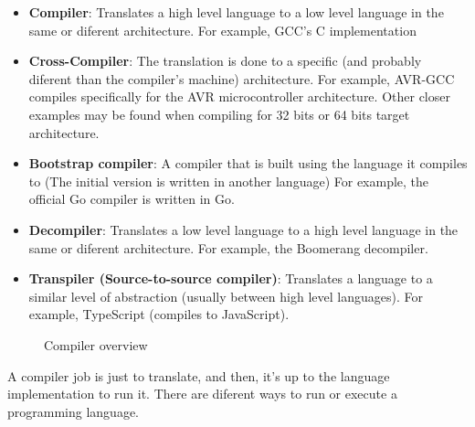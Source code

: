 \begin{itemize}
    \item \textbf{Compiler}: Translates a high level language to a low level language in the same or diferent architecture.
        For example, GCC's C implementation
    \item \textbf{Cross-Compiler}: The translation is done to a specific (and probably diferent than the compiler's machine) architecture.
        For example, AVR-GCC compiles specifically for the AVR microcontroller architecture. Other closer examples may be found when compiling for
        32 bits or 64 bits target architecture.
    \item \textbf{Bootstrap compiler}: A compiler that is built using the language it compiles to (The initial version is written in another language)
        For example, the official Go compiler is written in Go.
    \item \textbf{Decompiler}: Translates a low level language to a high level language in the same or diferent architecture.
        For example, the Boomerang decompiler.
    \item \textbf{Transpiler (Source-to-source compiler)}: Translates a language to a similar level of abstraction (usually between high level languages).
        For example, TypeScript (compiles to JavaScript).
\end{itemize}

\begin{figure}[H]
    \centering

    \caption{Compiler overview}
    \label{fig:compiler_overview}
\end{figure}

A compiler job is just to translate, and then, it's up to the language implementation to run it. There are diferent ways to
run or execute a programming language.

